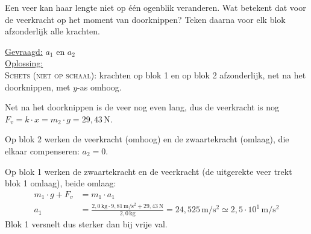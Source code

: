 \documentclass{ximera}
\newcommand{\blokje}[4][left]{\fill (#2,#3) circle (0.05); \node[#1, inner sep=3pt] at (#2,#3) {#4};}
\newcommand{\kr}[7][kracht]{\draw[#1] (#2,#3) -- ++(#4,#5) node[#6] {#7};}
\newcommand{\positiepijl}[6]{\draw[positie, draw=black!50, text=black!50] (#1,#2) -- ++(#3,#4) node[#5] {#6};}
\begin{document}
\begin{exercise}
\begin{question}
        \begin{hint}
            Een veer kan haar lengte niet op één ogenblik veranderen. Wat betekent dat voor de veerkracht op het moment van doorknippen? Teken daarna voor elk blok afzonderlijk alle krachten.
        \end{hint}

        \begin{solution}\nl
            \underline{Gevraagd:} $a_{1}$ en $a_{2}$ \\

            \underline{Oplossing:}\\
            \textsc{Schets (niet op schaal):} krachten op blok 1 en op blok 2 afzonderlijk, net na het doorknippen, met $y$-as omhoog.
            \begin{center}
            \end{center}
            Net na het doorknippen is de veer nog even lang, dus de veerkracht is nog $F_{v} = k \cdot x = m_{2} \cdot g = 29{,}43 \, \mathrm{N}$. 

            Op blok 2 werken de veerkracht (omhoog) en de zwaartekracht (omlaag), die elkaar compenseren: $a_{2} = 0$.

            Op blok 1 werken de zwaartekracht en de veerkracht (de uitgerekte veer trekt blok 1 omlaag), beide omlaag:
            \begin{align*}
                m_{1} \cdot g + F_{v} &= m_{1} \cdot a_{1} \\
                a_{1} &= \frac{2{,}0 \, \mathrm{kg} \cdot 9{,}81 \, \mathrm{m/s^2} + 29{,}43 \, \mathrm{N}}{2{,}0 \, \mathrm{kg}} = 24{,}525 \, \mathrm{m/s^2} \simeq \boxed{2{,}5\cdot 10^{1} \, \mathrm{m/s^2}}
            \end{align*}
            Blok 1 versnelt dus sterker dan bij vrije val.
        \end{solution}
    \end{question}


\end{exercise}
\end{document}
